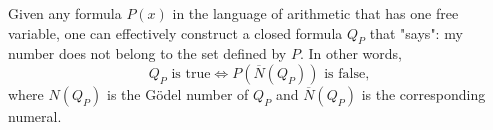Given any formula $P(x)$ in the language of arithmetic that has one free variable, one can effectively construct a closed formula $Q_P$ that "says": my number does not belong to the set defined by $P$. In other words,
$$Q_P \text{ is true} \iff P(\overline{N}(Q_P)) \text{ is false},$$
where $N(Q_P)$ is the Gödel number of $Q_P$ and $\overline{N}(Q_P)$ is the corresponding numeral.
